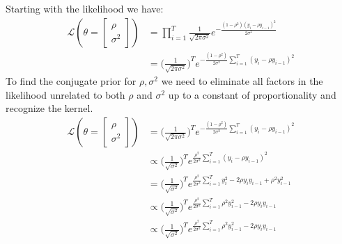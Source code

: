 \subsection{}

Starting with the likelihood we have:
\begin{align*}
    \mathcal{L}(\theta = \begin{bmatrix}\rho \\ \sigma^2\end{bmatrix}) 
    &= \prod_{i=1}^T \frac{1}{\sqrt{2\pi \sigma^2}}e^{-\frac{(1-\rho^2)(y_i - \rho y_{i-1})^2}{2\sigma^2}}\\
    &=  \Big(\frac{1}{\sqrt{2\pi \sigma^2}}\Big)^T e^{-\frac{(1-\rho^2)}{2\sigma^2}\sum_{i=1}^T (y_i - \rho y_{i-1})^2}
\end{align*}
To find the conjugate prior for $\rho, \sigma^2$ we need to eliminate all factors in the likelihood unrelated to both  $\rho$ and $\sigma^2$ up to a constant of proportionality and recognize the kernel.
\begin{align*}
    \mathcal{L}(\theta = \begin{bmatrix}\rho \\ \sigma^2\end{bmatrix}) 
    &=  \Big(\frac{1}{\sqrt{2\pi \sigma^2}}\Big)^T e^{-\frac{(1-\rho^2)}{2\sigma^2}\sum_{i=1}^T (y_i - \rho y_{i-1})^2}\\
    &\propto \Big(\frac{1}{\sqrt{\sigma^2}}\Big)^T e^{\frac{\rho^2}{2\sigma^2}\sum_{i=1}^T (y_i - \rho y_{i-1})^2}\\
    &= \Big(\frac{1}{\sqrt{\sigma^2}}\Big)^T e^{\frac{\rho^2}{2\sigma^2}\sum_{i=1}^T y_i^2 -2\rho y_i y_{i-1} +\rho^2 y_{i-1}^2}\\
    &\propto \Big(\frac{1}{\sqrt{\sigma^2}}\Big)^T e^{\frac{\rho^2}{2\sigma^2}\sum_{i=1}^T \rho^2 y_{i-1}^2 -2\rho y_i y_{i-1}} \\
    &\propto \Big(\frac{1}{\sqrt{\sigma^2}}\Big)^T e^{\frac{\rho^2}{2\sigma^2}\sum_{i=1}^T \rho^2 y_{i-1}^2 -2\rho y_i y_{i-1}} \tag*{(completing the square)}\\
\end{align*}
